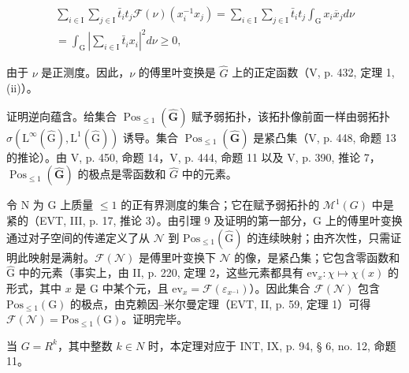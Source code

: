 \[
\begin{array}{r} \sum_ {i \in \mathrm{I}} \sum_ {j \in \mathrm{I}} \bar {t} _ {i} t _ {j} \mathcal {F} (\nu) (x _ {i} ^ {- 1} x _ {j}) = \sum_ {i \in \mathrm{I}} \sum_ {j \in \mathrm{I}} \bar {t} _ {i} t _ {j} \int_ {\mathrm{G}} x _ {i} \overline {{x}} _ {j} d \nu \\ = \int_ {\mathrm{G}} \left| \sum_ {i \in \mathrm{I}} \bar {t} _ {i} x _ {i} \right| ^ {2} d \nu \geqslant 0, \end{array}
\]

由于 \(\nu\) 是正测度。因此，\(\nu\) 的傅里叶变换是 \(\hat{G}\) 上的正定函数（V, p. 432, 定理 1, (ii)）。

证明逆向蕴含。给集合 \(\operatorname{Pos}_{\leqslant1}(\widehat{\mathbf{G}})\) 赋予弱拓扑，该拓扑像前面一样由弱拓扑 \(\sigma(\mathrm{L}^{\infty}(\widehat{\mathrm{G}}),\mathrm{L}^{1}(\widehat{\mathrm{G}}))\) 诱导。集合 \(\operatorname{Pos}_{\leqslant1}(\widehat{\mathbf{G}})\) 是紧凸集（V, p. 448, 命题 13 的推论）。由 V, p. 450, 命题 14，V, p. 444, 命题 11 以及 V, p. 390, 推论 7，\(\operatorname{Pos}_{\leqslant1}(\widehat{\mathbf{G}})\) 的极点是零函数和 \(\widehat{G}\) 中的元素。

令 N 为 G 上质量 \(\leqslant 1\) 的正有界测度的集合；它在赋予弱拓扑的 \(\mathcal{M}^{1}(G)\) 中是紧的（EVT, III, p. 17, 推论 3）。由引理 9 及证明的第一部分，G 上的傅里叶变换通过对子空间的传递定义了从 \(\mathcal{N}\) 到 \(\mathrm{Pos}_{\leqslant 1}(\widehat{\mathrm{G}})\) 的连续映射；由齐次性，只需证明此映射是满射。\(\mathcal{F}(\mathcal{N})\) 是傅里叶变换下 \(\mathcal{N}\) 的像，是紧凸集；它包含零函数和 \(\widehat{\mathrm{G}}\) 中的元素（事实上，由 II, p. 220, 定理 2，这些元素都具有 \(\mathrm{ev}_x\colon \chi \mapsto \chi (x)\) 的形式，其中 \(x\) 是 G 中某个元，且 \(\mathrm{ev}_x = \mathcal{F}(\varepsilon_{x^{-1}})\)）。因此集合 \(\mathcal{F}(\mathcal{N})\) 包含 \(\mathrm{Pos}_{\leqslant 1}(\mathrm{G})\) 的极点，由克赖因–米尔曼定理（EVT, II, p. 59, 定理 1）可得 \(\mathcal{F}(\mathcal{N}) = \mathrm{Pos}_{\leqslant 1}(\mathrm{G})\)。证明完毕。

当 \(G = R^{k}\)，其中整数 \(k \in N\) 时，本定理对应于 INT, IX, p. 94, § 6, no. 12, 命题 11。

